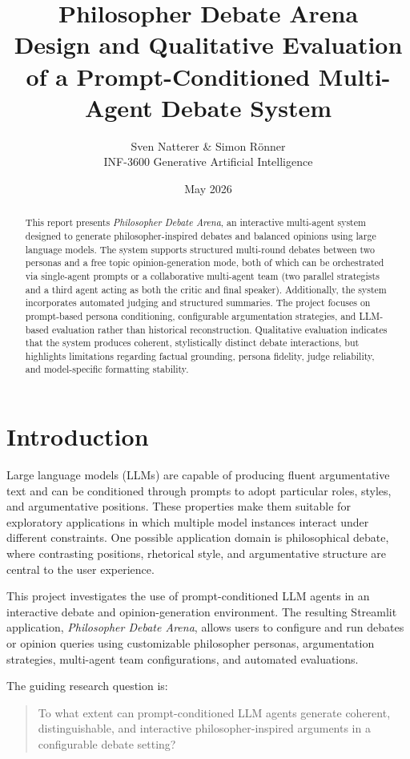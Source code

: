 \documentclass[11pt,a4paper]{article}
\title{
    \textbf{Philosopher Debate Arena}\\
    \large Design and Qualitative Evaluation of a Prompt-Conditioned Multi-Agent Debate System
}
\author{
    Sven Natterer \& Simon Rönner\\
    INF-3600 Generative Artificial Intelligence
}
\date{May 2026}
\begin{document}
\maketitle

\begin{abstract}
This report presents \emph{Philosopher Debate Arena}, an interactive multi-agent system designed to generate philosopher-inspired debates and balanced opinions using large language models. The system supports structured multi-round debates between two personas and a free topic opinion-generation mode, both of which can be orchestrated via single-agent prompts or a collaborative multi-agent team (two parallel strategists and a third agent acting as both the critic and final speaker). Additionally, the system incorporates automated judging and structured summaries. The project focuses on prompt-based persona conditioning, configurable argumentation strategies, and LLM-based evaluation rather than historical reconstruction. Qualitative evaluation indicates that the system produces coherent, stylistically distinct debate interactions, but highlights limitations regarding factual grounding, persona fidelity, judge reliability, and model-specific formatting stability.
\end{abstract}

\section{Introduction}

Large language models (LLMs) are capable of producing fluent argumentative text and can be conditioned through prompts to adopt particular roles, styles, and argumentative positions. These properties make them suitable for exploratory applications in which multiple model instances interact under different constraints. One possible application domain is philosophical debate, where contrasting positions, rhetorical style, and argumentative structure are central to the user experience.

This project investigates the use of prompt-conditioned LLM agents in an interactive debate and opinion-generation environment. The resulting Streamlit application, \emph{Philosopher Debate Arena}, allows users to configure and run debates or opinion queries using customizable philosopher personas, argumentation strategies, multi-agent team configurations, and automated evaluations.

The guiding research question is:

\begin{quote}
To what extent can prompt-conditioned LLM agents generate coherent, distinguishable, and interactive philosopher-inspired arguments in a configurable debate setting?
\end{quote}
\end{document}
